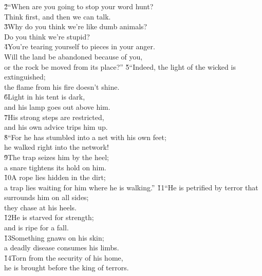 \begin{poetry}
\poeml \v{2}``When are you going to stop your word hunt? \\
\poemll    Think first, and then we can talk. \\
\poeml \v{3}Why do you think we're like dumb animals? \\
\poemll    Do you think we're stupid? \\
\poeml \v{4}You're tearing yourself to pieces in your anger. \\
\poemll    Will the land be abandoned because of you, \\
\poemlll       or the rock be moved from its place?''
\poeml \v{5}``Indeed, the light of the wicked is extinguished; \\
\poemll    the flame from his fire doesn't shine. \\
\poeml \v{6}Light in his tent is dark, \\
\poemll    and his lamp goes out above him. \\
\poeml \v{7}His strong steps are restricted, \\
\poemll    and his own advice trips him up. \\
\poeml \v{8}``For he has stumbled into a net with his own feet; \\
\poemll    he walked right into the network! \\
\poeml \v{9}The trap seizes him by the heel; \\
\poemll    a snare tightens its hold on him. \\
\poeml \v{10}A rope lies hidden in the dirt; \\
\poemll    a trap lies waiting for him where he is walking.''
\poeml \v{11}``He is petrified by terror that surrounds him on all sides; \\
\poemll    they chase at his heels. \\
\poeml \v{12}He is starved for strength; \\
\poemll    and is ripe for a fall. \\
\poeml \v{13}Something gnaws on his skin; \\
\poemll    a deadly disease consumes his limbs. \\
\poeml \v{14}Torn from the security of his home, \\
\poemll    he is brought before the king of terrors. \\

\end{poetry}
